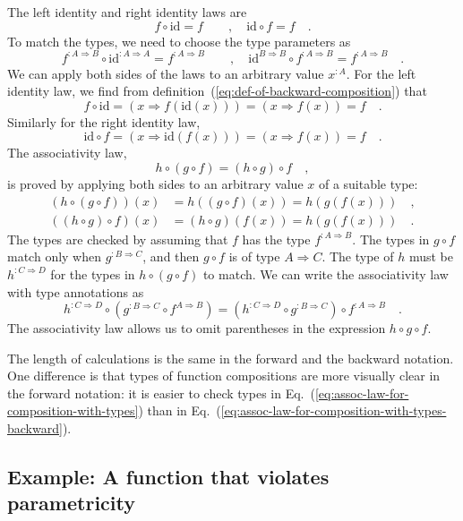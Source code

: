 The left identity and right identity laws are
\[
f\circ\text{id}=f\quad\quad,\quad\text{id}\circ f=f\quad.
\]
To match the types, we need to choose the type parameters as
\[
f^{:A\Rightarrow B}\circ\text{id}^{:A\Rightarrow A}=f^{:A\Rightarrow B}\quad\quad,\quad\text{id}^{B\Rightarrow B}\circ f^{:A\Rightarrow B}=f^{:A\Rightarrow B}\quad.
\]
We can apply both sides of the laws to an arbitrary value $x^{:A}$.
For the left identity law, we find from definition~(\ref{eq:def-of-backward-composition})
that
\[
f\circ\text{id}=\left(x\Rightarrow f(\text{id}(x))\right)=\left(x\Rightarrow f(x)\right)=f\quad.
\]
Similarly for the right identity law,
\[
\text{id}\circ f=\left(x\Rightarrow\text{id}\left(f\left(x\right)\right)\right)=\left(x\Rightarrow f\left(x\right)\right)=f\quad.
\]
The associativity law,
\[
h\circ\left(g\circ f\right)=\left(h\circ g\right)\circ f\quad,
\]
is proved by applying both sides to an arbitrary value $x$ of a suitable
type:
\begin{align*}
\left(h\circ\left(g\circ f\right)\right)(x) & =h\left(\left(g\circ f\right)(x)\right)=h\left(g\left(f\left(x\right)\right)\right)\quad,\\
\left(\left(h\circ g\right)\circ f\right)(x) & =\left(h\circ g\right)\left(f(x)\right)=h\left(g\left(f\left(x\right)\right)\right)\quad.
\end{align*}
The types are checked by assuming that $f$ has the type $f^{:A\Rightarrow B}$.
The types in $g\circ f$ match only when $g^{:B\Rightarrow C}$, and
then $g\circ f$ is of type $A\Rightarrow C$. The type of $h$ must
be $h^{:C\Rightarrow D}$ for the types in $h\circ\left(g\circ f\right)$
to match. We can write the associativity law with type annotations
as
\begin{equation}
h^{:C\Rightarrow D}\circ(g^{:B\Rightarrow C}\circ f^{A\Rightarrow B})=(h^{:C\Rightarrow D}\circ g^{:B\Rightarrow C})\circ f^{:A\Rightarrow B}\quad.\label{eq:assoc-law-for-composition-with-types-backward}
\end{equation}
The associativity law allows us to omit parentheses in the expression
$h\circ g\circ f$. 

The length of calculations is the same in the forward and the backward
notation. One difference is that types of function compositions are
more visually clear in the forward notation: it is easier to check
types in Eq.~(\ref{eq:assoc-law-for-composition-with-types}) than
in Eq.~(\ref{eq:assoc-law-for-composition-with-types-backward}).

\subsection{Example: A function that violates parametricity }

